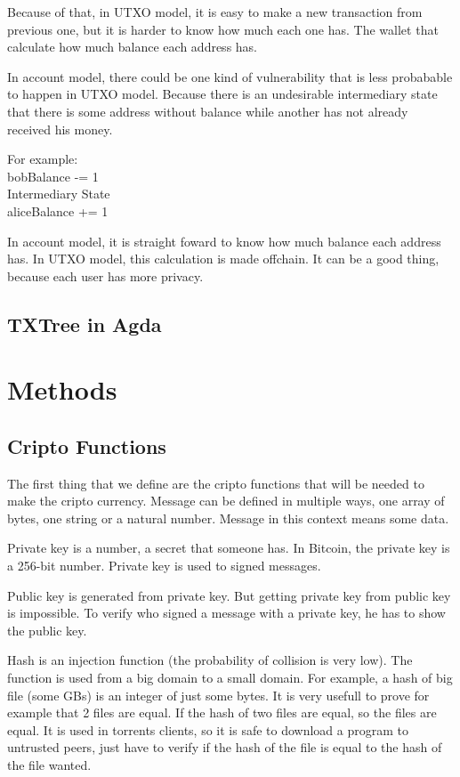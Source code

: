 \documentclass[12pt]{article}
\begin{document}
Because of that, in UTXO model, it is easy to make a new transaction from previous one, but it is harder to know how much each one has.
The wallet that calculate how much balance each address has.

In account model, there could be one kind of vulnerability that is less probabable to happen in UTXO model.
Because there is an undesirable intermediary state that there is some address without balance while another has not already received his money.

For example: \\
bobBalance -= 1 \\
Intermediary State \\
aliceBalance += 1

In account model, it is straight foward to know how much balance each address has.
In UTXO model, this calculation is made offchain. It can be a good thing,
because each user has more privacy.

\subsection{TXTree in Agda}

\section{Methods}

\subsection{Cripto Functions}
The first thing that we define are the cripto functions that will be needed to make the cripto currency.
Message can be defined in multiple ways, one array of bytes, one string or a natural number.
Message in this context means some data.

Private key is a number, a secret that someone has.
In Bitcoin, the private key is a 256-bit number.
Private key is used to signed messages.

Public key is generated from private key.
But getting private key from public key is impossible.
To verify who signed a message with a private key, he has to show the public key.

Hash is an injection function (the probability of collision is very low).
The function is used from a big domain to a small domain.
For example, a hash of big file (some GBs) is an integer of just some bytes.
It is very usefull to prove for example that 2 files are equal.
If the hash of two files are equal, so the files are equal.
It is used in torrents clients, so it is safe to download a program to untrusted peers,
just have to verify if the hash of the file is equal to the hash of the file wanted.
\end{document}
